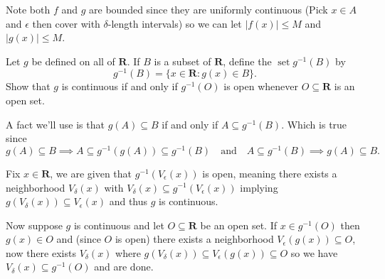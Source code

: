 \begin{solution}
  Note both $f$ and $g$ are bounded since they are uniformly continuous (Pick $x \in A$ and $\epsilon$ then cover with $\delta$-length intervals) so we can let $|f(x)| \le M$ and $|g(x)| \le M$.

\end{solution}

\begin{exercise}
  Let $g$ be defined on all of $\mathbf{R}$. If $B$ is a subset of $\mathbf{R}$, define the $\operatorname{set} g^{-1}(B)$ by
  $$
  g^{-1}(B)=\{x \in \mathbf{R}: g(x) \in B\} .
  $$
  Show that $g$ is continuous if and only if $g^{-1}(O)$ is open whenever $O \subseteq \mathbf{R}$ is an open set.
\end{exercise}

\begin{solution}
  A fact we'll use is that $g(A) \subseteq B$ if and only if $A \subseteq g^{-1}(B)$. Which is true since
  $$
  g(A) \subseteq B \implies A \subseteq g^{-1}(g(A)) \subseteq g^{-1}(B)
  \quad\text{and}\quad
  A \subseteq g^{-1}(B) \implies g(A) \subseteq B.
  $$

  Fix $x \in \mathbf{R}$, we are given that $g^{-1}(V_\epsilon(x))$ is open, meaning there exists a neighborhood $V_\delta(x)$ with $V_\delta(x) \subseteq g^{-1}(V_\epsilon(x))$ implying $g(V_\delta(x)) \subseteq V_\epsilon(x)$ and thus $g$ is continuous.

  Now suppose $g$ is continuous and let $O \subseteq \mathbf{R}$ be an open set. If $x \in g^{-1}(O)$ then $g(x) \in O$ and (since $O$ is open) there exists a neighborhood $V_\epsilon(g(x)) \subseteq O$, now there exists $V_\delta(x)$ where $g(V_\delta(x)) \subseteq V_\epsilon(g(x)) \subseteq O$ so we have $V_\delta(x) \subseteq g^{-1}(O)$ and are done.
\end{solution}

